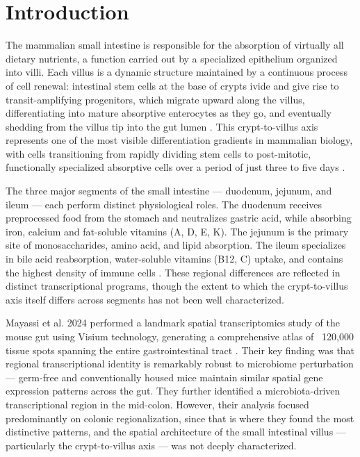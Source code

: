 \documentclass[11pt, a4paper]{article}
\begin{document}
\section{Introduction}

The mammalian small intestine is responsible for the absorption of 
virtually all dietary nutrients, a function carried out by a 
specialized epithelium organized into villi. Each villus is a dynamic 
structure maintained by a continuous process of cell renewal: 
intestinal stem cells at the base of crypts ivide and give rise to 
transit-amplifying progenitors, which migrate upward along the villus, 
differentiating into mature absorptive enterocytes as they go, and 
eventually shedding from the villus tip into the gut lumen 
\cite{kai2021intestinal}. This crypt-to-villus 
axis represents one of the most visible differentiation gradients in 
mammalian biology, with cells transitioning from rapidly dividing 
stem cells to post-mitotic, functionally specialized absorptive cells 
over a period of just three to five days \cite{barrett2018mapping}.

The three major segments of the small intestine — duodenum, jejunum, 
and ileum — each perform distinct physiological roles. The duodenum 
receives preprocessed food from the stomach and neutralizes gastric acid, 
while absorbing iron, calcium and fat-soluble vitamins 
(A, D, E, K). The jejunum is the primary site of monosaccharides, 
amino acid, and lipid absorption. The ileum specializes in bile acid 
reabsorption, water-soluble vitamins (B12, C) uptake, and 
contains the highest density of immune cells \cite{santaolalla2011innate}. 
These regional differences are reflected in distinct transcriptional 
programs, though the extent to which the crypt-to-villus axis itself 
differs across segments has not been well characterized.

Mayassi et al. 2024 performed a landmark spatial transcriptomics 
study of the mouse gut using Visium technology, generating a 
comprehensive atlas of ~120,000 tissue spots spanning the entire 
gastrointestinal tract \cite{mayassi2024}. Their key finding was 
that regional transcriptional identity is remarkably robust to 
microbiome perturbation — germ-free and conventionally housed mice 
maintain similar spatial gene expression patterns across the gut. 
They further identified a microbiota-driven transcriptional region 
in the mid-colon. However, their analysis focused predominantly on 
colonic regionalization, since that is where they found the most 
distinctive patterns, and the spatial architecture of the small 
intestinal villus — particularly the crypt-to-villus axis — was 
not deeply characterized.
\end{document}
